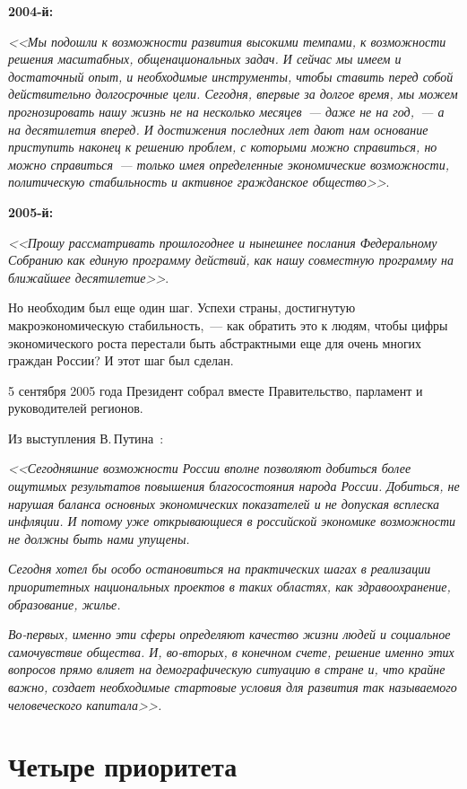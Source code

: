 \documentclass[article, 12pt, russian, oneside]{ncc}
\begin{document}
\textbf{2004-й:}

\emph{<<Мы подошли к возможности развития высокими темпами, к
  возможности решения масштабных, общенациональных задач. И сейчас мы
  имеем и достаточный опыт, и необходимые инструменты, чтобы ставить
  перед собой действительно долгосрочные цели. Сегодня, впервые за
  долгое время, мы можем прогнозировать нашу жизнь не на несколько
  месяцев~--- даже не на год,~--- а на десятилетия вперед. И
  достижения последних лет дают нам основание приступить наконец к
  решению проблем, с которыми можно справиться, но можно
  справиться~--- только имея определенные экономические возможности,
  политическую стабильность и активное гражданское
  общество>>}\cite{Putin_2004}.

\textbf{2005-й:}

\emph{<<Прошу рассматривать прошлогоднее и нынешнее послания
  Федеральному Собранию как единую программу действий, как нашу
  совместную программу на ближайшее десятилетие>>}\cite{Putin_2005}.

Но необходим был еще один шаг. Успехи страны, достигнутую
макроэкономическую стабильность,~--- как обратить это к людям, чтобы
цифры экономического роста перестали быть абстрактными еще для очень
многих граждан России? И этот шаг был сделан.

5 сентября 2005 года Президент собрал вместе Правительство, парламент
и руководителей регионов.

Из выступления В.\,Путина~\cite{Putin_Gov}:

\emph{<<Сегодняшние возможности России вполне позволяют добиться более
  ощутимых результатов повышения благосостояния народа
  России. Добиться, не нарушая баланса основных экономических
  показателей и не допуская всплеска инфляции. И потому уже
  открывающиеся в российской экономике возможности не должны быть нами
  упущены.}
    
\emph{Сегодня хотел бы особо остановиться на практических шагах в
  реализации приоритетных национальных проектов в таких областях, как
  здравоохранение, образование, жилье.}

\emph{Во-первых, именно эти сферы определяют качество жизни людей и
  социальное самочувствие общества. И, во-вторых, в конечном счете,
  решение именно этих вопросов прямо влияет на демографическую
  ситуацию в стране и, что крайне важно, создает необходимые стартовые
  условия для развития так называемого человеческого капитала>>.}
\newpage


\section{Четыре приоритета}
\end{document}
